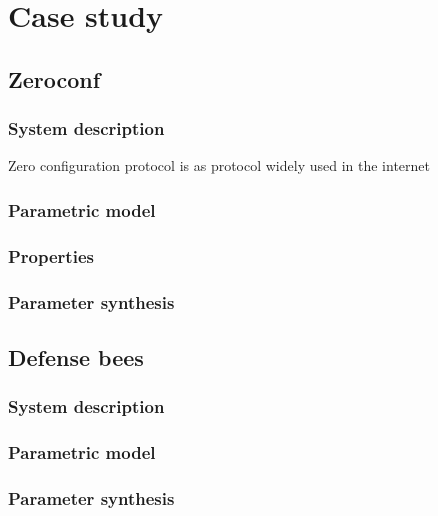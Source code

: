 \chapter{Case study}

\section{Zeroconf}
\subsection{System description}
Zero configuration protocol is as protocol widely used in the internet
\subsection{Parametric model}
\subsection{Properties}
\subsection{Parameter synthesis}


\section{Defense bees}
\subsection{System description}
\subsection{Parametric model}
\subsection{Parameter synthesis}